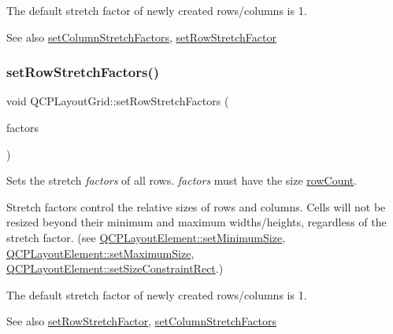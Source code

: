 The default stretch factor of newly created rows/columns is 1.

\begin{DoxySeeAlso}{See also}
\mbox{\hyperlink{class_q_c_p_layout_grid_a6c2591d1a7e2534ce036989543b49e57}{set\+Column\+Stretch\+Factors}}, \mbox{\hyperlink{class_q_c_p_layout_grid_a7b0273de5369bd93d942edbaf5b166ec}{set\+Row\+Stretch\+Factor}} 
\end{DoxySeeAlso}
\mbox{\label{class_q_c_p_layout_grid_a200b45f9c908f96ebadaa3c8d87a2782}} 
\subsubsection{\texorpdfstring{setRowStretchFactors()}{setRowStretchFactors()}}
{\footnotesize\ttfamily void Q\+C\+P\+Layout\+Grid\+::set\+Row\+Stretch\+Factors (\begin{DoxyParamCaption}\item[{const Q\+List$<$ double $>$ \&}]{factors }\end{DoxyParamCaption})}

Sets the stretch {\itshape factors} of all rows. {\itshape factors} must have the size \mbox{\hyperlink{class_q_c_p_layout_grid_a19c66fd76cbce58a8e94f33797e0c0aa}{row\+Count}}.

Stretch factors control the relative sizes of rows and columns. Cells will not be resized beyond their minimum and maximum widths/heights, regardless of the stretch factor. (see \mbox{\hyperlink{class_q_c_p_layout_element_a5dd29a3c8bc88440c97c06b67be7886b}{Q\+C\+P\+Layout\+Element\+::set\+Minimum\+Size}}, \mbox{\hyperlink{class_q_c_p_layout_element_a74eb5280a737ab44833d506db65efd95}{Q\+C\+P\+Layout\+Element\+::set\+Maximum\+Size}}, \mbox{\hyperlink{class_q_c_p_layout_element_a361666cdcc6fbfd37344cc44be746b0f}{Q\+C\+P\+Layout\+Element\+::set\+Size\+Constraint\+Rect}}.)

The default stretch factor of newly created rows/columns is 1.

\begin{DoxySeeAlso}{See also}
\mbox{\hyperlink{class_q_c_p_layout_grid_a7b0273de5369bd93d942edbaf5b166ec}{set\+Row\+Stretch\+Factor}}, \mbox{\hyperlink{class_q_c_p_layout_grid_a6c2591d1a7e2534ce036989543b49e57}{set\+Column\+Stretch\+Factors}} 
\end{DoxySeeAlso}
\mbox{\label{class_q_c_p_layout_grid_ab36af18d77e4428386d02970382ee598}} 
